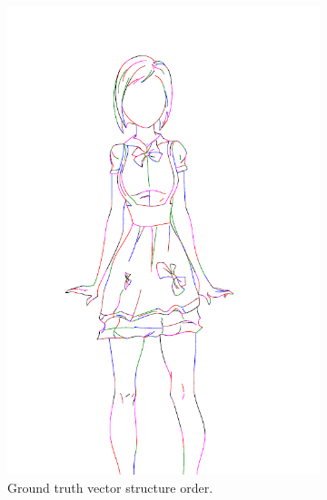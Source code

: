 \begin{figure}[h]
    \centering
    \begin{subfigure}{.3\textwidth}
    \includegraphics[width=\textwidth]{graphics/outputs/ground-truth/order/sketchbench-black_Art_freeform_AG_03_Branislav Mirkovic_norm_cleaned.pdf}
    \caption{Ground truth vector structure order.}
    \end{subfigure}
    \begin{subfigure}{.3\textwidth}

\end{subfigure}
\end{figure}
